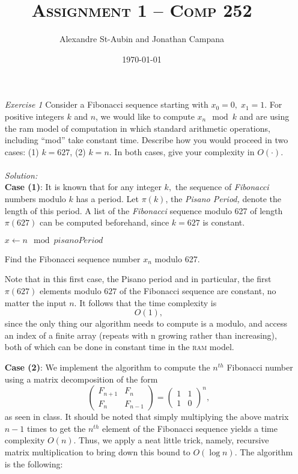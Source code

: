 \documentclass[12pt]{article}
\title{\textsc{Assignment 1 -- Comp 252}}
\author{Alexandre St-Aubin and Jonathan Campana}
\date{\today}
\theoremstyle{definition}
\theoremstyle{remark}
\newcommand\sol{%
  \\ 
  \\
  \textit{Solution:}\\%
}
\begin{document}
\maketitle 
\begin{enumerate}
  \item[\it Exercise 1] Consider a Fibonacci sequence starting with $x_0 = 0,\; x_1 = 1$. For positive integers $k$ and $n$, we would like to compute $x_n \mod k$ and are using the ram model of computation in which standard arithmetic operations, including “mod” take constant time. Describe how you would proceed in two cases: (1) $k = 627$, (2) $k = n$. In both cases, give your complexity in $O(\cdot)$.
  \sol  
  \textbf{Case (1)}: It is known that for any integer $k,$ the sequence of \textit{Fibonacci} numbers modulo $k$ has a period. Let $\pi (k)$, the \textit{Pisano Period, }denote the length of this period. A list of the \textit{Fibonacci} sequence modulo 627 of length $\pi (627)$ can be computed beforehand, since $k=627$ is constant. 

\IncMargin{1em}
\begin{algorithm}
\BlankLine
  {$x \leftarrow n \mod pisanoPeriod$}
\caption{Find the Fibonacci sequence number $x_n$ modulo 627. }\label{algo_disjdecomp}
\end{algorithm}\DecMargin{1em}
  Note that in this first case, the Pisano period and in particular, the first $\pi (627)$ elements modulo $627$ of the Fibonacci sequence are constant, no matter the input $n$. It follows that the time complexity is 
  $$O(1), $$
  since the only thing our algorithm needs to compute is a modulo, and access an index of a finite array (repeats with n growing rather than increasing), both of which can be done in constant time in the \textsc{ram} model.

  \newpage 

  
  \textbf{Case (2)}: \newline 
  We implement the algorithm to compute the $n^{th}$ Fibonacci number using a matrix decomposition of the form 
  $$\begin{pmatrix}
    F_{n+1} & F_{n} \\ F_n & F_{n-1}
  \end{pmatrix} = \begin{pmatrix}
    1 & 1 \\ 1  &0
  \end{pmatrix}^n, $$
  as seen in class. It should be noted that simply multiplying the above matrix $n-1$ times to get the $n^{th}$ element of the Fibonacci sequence yields a time complexity $O(n).$ Thus, we apply a neat little trick, namely, recursive matrix multiplication to bring down this bound to $O(\log n)$. The algorithm is the following:


\end{enumerate}
\end{document}
